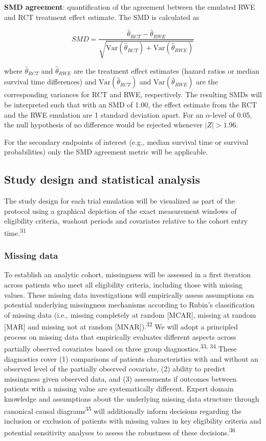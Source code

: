 \documentclass[
  letterpaper,
  DIV=11,
  numbers=noendperiod]{scrartcl}
\begin{document}
\textbf{SMD agreement}: quantification of the agreement between the
emulated RWE and RCT treatment effect estimate. The SMD is calculated as

\[
SMD = \frac{\hat{\theta}_{RCT} - \hat{\theta}_{RWE}}{\sqrt{\text{Var}(\hat{\theta}_{RCT}) + \text{Var}(\hat{\theta}_{RWE})}}
\]

where \(\hat{\theta}_{RCT}\) and \(\hat{\theta}_{RWE}\) are the
treatment effect estimates (hazard ratios or median survival time
differences) and \(\text{Var}(\hat{\theta}_{RCT})\) and
\(\text{Var}(\hat{\theta}_{RWE})\) are the corresponding variances for
RCT and RWE, respectively. The resulting SMDs will be interpreted such
that with an SMD of 1.00, the effect estimate from the RCT and the RWE
emulation are 1 standard deviation apart. For an \(\alpha\)-level of
0.05, the null hypothesis of no difference would be rejected whenever
\(|Z| > 1.96\).

For the secondary endpoints of interest (e.g., median survival time or
survival probabilities) only the SMD agreement metric will be
applicable.

\subsection{Study design and statistical
analysis}\label{study-design-and-statistical-analysis}

The study design for each trial emulation will be visualized as part of
the protocol using a graphical depiction of the exact measurement
windows of eligibility criteria, washout periods and covariates relative
to the cohort entry time.\textsuperscript{31}

\subsubsection{Missing data}\label{missing-data}

To establish an analytic cohort, missingness will be assessed in a first
iteration across patients who meet all eligibility criteria, including
those with missing values. These missing data investigations will
empirically assess assumptions on potential underlying missingness
mechanisms according to Rubin's classification of missing data (i.e.,
missing completely at random {[}MCAR{]}, missing at random {[}MAR{]} and
missing not at random {[}MNAR{]}).\textsuperscript{32} We will adopt a
principled process on missing data that empirically evaluates different
aspects across partially observed covariates based on three group
diagnostics.\textsuperscript{33, 34} These diagnostics cover (1)
comparisons of patients characteristics with and without an observed
level of the partially observed covariate, (2) ability to predict
missingness given observed data, and (3) assessments if outcomes between
patients with a missing value are systematically different. Expert
domain knowledge and assumptions about the underlying missing data
structure through canonical causal diagrams\textsuperscript{35} will
additionally inform decisions regarding the inclusion or exclusion of
patients with missing values in key eligibility criteria and potential
sensitivity analyses to assess the robustness of these
decisions.\textsuperscript{36}
\end{document}
